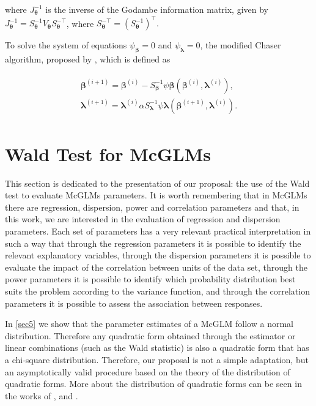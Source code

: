 \documentclass[AMA,STIX1COL]{WileyNJD-v2}
\begin{document}
\noindent where $J_{\boldsymbol{\theta}}^{-1}$ is the inverse of the Godambe information matrix, given by $J_{\boldsymbol{\theta}}^{-1} = S_{ \boldsymbol{\theta}}^{-1} V_{\boldsymbol{\theta}} S_{\boldsymbol{\theta}}^{-\top}$, where $S_{\boldsymbol{\theta}} ^{-\top} = (S_{\boldsymbol{\theta}}^{-1})^{\top}.$

To solve the system of equations $\psi_{\boldsymbol{\beta}} = 0$ and $\psi_{\boldsymbol{\lambda}} = 0$, the modified Chaser algorithm, proposed by \cite{jorg04}, which is defined as

$$
\begin{aligned}
\begin{matrix}
\boldsymbol{\beta}^{(i+1)} = \boldsymbol{\beta}^{(i)}- S_{\boldsymbol{\beta}}^{-1} \psi \boldsymbol{\beta} (\boldsymbol{\beta}^{(i)}, \boldsymbol{\lambda}^{(i)}), \\ 
\boldsymbol{\lambda}^{(i+1)} = \boldsymbol{\lambda}^{(i)}\alpha S_{\boldsymbol{\lambda}}^{-1} \psi \boldsymbol{\lambda} (\boldsymbol{\beta}^{(i+1)}, \boldsymbol{\lambda}^{(i)}).
\end{matrix}
\end{aligned}
$$


\section{Wald Test for McGLMs}\label{sec4}

This section is dedicated to the presentation of our proposal: the use of the Wald test to evaluate McGLMs parameters. It is worth remembering that in McGLMs there are regression, dispersion, power and correlation parameters and that, in this work, we are interested in the evaluation of regression and dispersion parameters. Each set of parameters has a very relevant practical interpretation in such a way that through the regression parameters it is possible to identify the relevant explanatory variables, through the dispersion parameters it is possible to evaluate the impact of the correlation between units of the data set, through the power parameters it is possible to identify which probability distribution best suits the problem according to the variance function, and through the correlation parameters it is possible to assess the association between responses.

In \autoref{sec5} we show that the parameter estimates of a McGLM follow a normal distribution. Therefore any quadratic form obtained through the estimator or linear combinations (such as the Wald statistic) is also a quadratic form that has a chi-square distribution. Therefore, our proposal is not a simple adaptation, but an asymptotically valid procedure based on the theory of the distribution of quadratic forms. More about the distribution of quadratic forms can be seen in the works of \cite{graybill1957idempotent}, \cite{luther1965decomposition} and \cite{baldessari1967distribution}.
\end{document}
